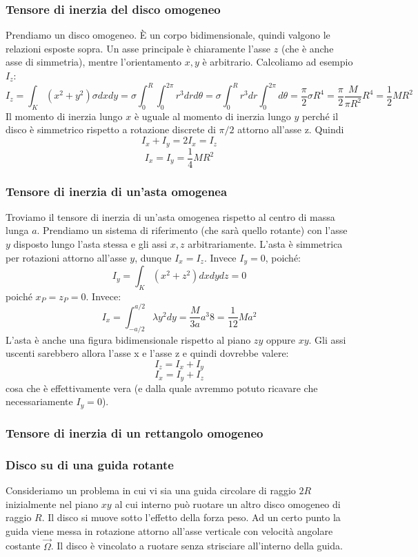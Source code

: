 \documentclass[a4paper,openany]{article}
\begin{document}
	\subsubsection{Tensore di inerzia del disco omogeneo}
	Prendiamo un disco omogeneo. È un corpo bidimensionale, quindi valgono le relazioni esposte sopra. Un asse principale è chiaramente l'asse $z$ (che è anche asse di simmetria), mentre l'orientamento $x,y$ è arbitrario. Calcoliamo ad esempio $I_z$:
	\begin{equation*}\label{key}
		I_{z} = \int_{K}(x^2+y^{2})\sigma dxdy =\sigma \int_{0}^{R}\int_{0}^{2\pi}r^{3}drd\theta = \sigma\int_{0}^{R}r^3 dr \int_{0}^{2\pi} d\theta = \dfrac{\pi}{2}\sigma R^{4} = \dfrac{\pi}{2}\dfrac{M}{\pi R^{2}}R^{4} = \dfrac{1}{2}MR^{2}
	\end{equation*}
	Il momento di inerzia lungo $x$ è uguale al momento di inerzia lungo $y$ perché il disco è simmetrico rispetto a rotazione discrete di $\pi/2$ attorno all'asse z. Quindi
	$$
	I_x + I_y = 2I_x = I_z
	$$
	$$
	I_x = I_y = \dfrac{1}{4}MR^2
	$$
	\subsubsection{Tensore di inerzia di un'asta omogenea}
	Troviamo il tensore di inerzia di un'asta omogenea rispetto al centro di massa lunga $a$. Prendiamo un sistema di riferimento (che sarà quello rotante) con l'asse $y$ disposto lungo l'asta stessa e gli assi $x,z$ arbitrariamente. L'asta è simmetrica per rotazioni attorno all'asse $y$, dunque $I_x = I_z$. Invece $I_y = 0$, poiché:
	$$
	I_y = \int_{K}(x^2+z^2)dxdydz = 0
	$$
	poiché $x_{P} = z_{P} = 0$. Invece:
	$$
	I_{x} = \int_{-a/2}^{a/2}\lambda y^2 dy = \dfrac{M}{3a}{a^3}{8} = \dfrac{1}{12}Ma^{2}
	$$
	L'asta è anche una figura bidimensionale rispetto al piano $zy$ oppure $xy$. Gli assi uscenti sarebbero allora l'asse x e l'asse z e quindi dovrebbe valere:
	$$
	I_{z} = I_{x} + I_{y}
	$$
	$$
	I_x = I_y + I_z
	$$
	cosa che è effettivamente vera (e dalla quale avremmo potuto ricavare che necessariamente $I_y = 0$).
	\subsubsection{Tensore di inerzia di un rettangolo omogeneo}
	\subsubsection{Disco su di una guida rotante}
	Consideriamo un problema in cui vi sia una guida circolare di raggio $2R$ inizialmente nel piano $xy$ al cui interno può ruotare un altro disco omogeneo di raggio $R$. Il disco si muove sotto l'effetto della forza peso. Ad un certo punto la guida viene messa in rotazione attorno all'asse verticale con velocità angolare costante $\vec{\Omega}$. Il disco è vincolato a ruotare senza strisciare all'interno della guida.
	
\end{document}
